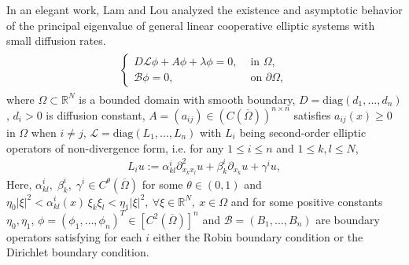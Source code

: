 \documentclass[a4paper,11pt]{amsart}
\theoremstyle{definition}
\def\R{\mathbb{R}}
\def\O{\Omega}
\numberwithin{equation}{section}
\theoremstyle{definition}
\def\O{\Omega}
\begin{document}
In an elegant work, Lam and Lou \cite{lam_ays_2016} analyzed the existence and asymptotic behavior of the principal eigenvalue of general linear cooperative elliptic systems with small diffusion rates.
\begin{align*}
\begin{split}
\left\{\begin{array}{lllll}
D\mathcal{L}\phi+A\phi+\lambda \phi =0, &\text{ in }\O,\\
\mathcal{B}\phi = 0, &\text{ on }\partial \O,
\end{array}\right.
\end{split}
\end{align*}
where $\O\subset \R^N$ is a bounded domain with smooth boundary, $D=\text{diag}(d_1,...,d_n)$, $d_i>0$ is diffusion constant,
$A=(a_{ij})\in (C(\overline{\Omega}))^{n\times n}$ satisfies $a_{ij}(x)\geq 0$ in $\Omega$ when $i\neq j$, $\mathcal{L}=\text{diag}(L_1,...,L_n)$ with $L_i$ being second-order elliptic operators of non-divergence form, i.e. for any $1\leq i \leq n$ and $1\leq k,l\leq N$, 
\begin{align*}
L_iu:=\alpha^i_{kl}\partial^2_{x_kx_l}u+\beta^i_k\partial_{x_k}u+\gamma^iu,
\end{align*}
Here, $\alpha^i_{kl},\;\beta^i_k,\;\gamma^i\in C^\theta(\overline{\Omega})$ for some $\theta\in(0,1)$ and $\eta_0|\xi|^2<\alpha^i_{kl}(x)\,\xi_k\xi_l<\eta_1|\xi|^2,~\forall \xi\in\mathbb{R}^N,\ x\in\Omega$ and for some positive constants $\eta_0,\eta_1$, $\phi=(\phi_1,\dots,\phi_n)^T\in [C^2(\overline{\Omega})]^n$  and 
$\mathcal{B}=(B_1,\dots,B_n)$ are boundary operators satisfying for each $i$ either the Robin boundary condition or the Dirichlet boundary condition.
\end{document}
